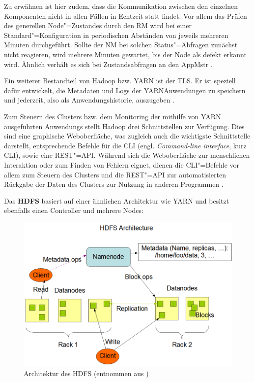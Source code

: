 Zu erwähnen ist hier zudem, dass die Kommunikation zwischen den einzelnen Komponenten nicht in allen Fällen in Echtzeit statt findet.
Vor allem das Prüfen des generellen Node"=Zustandes durch den \gls{RM} wird bei einer Standard"=Konfiguration in periodischen Abständen von jeweils mehreren Minuten durchgeführt.
Sollte der \gls{NM} bei solchen Status"=Abfragen zunächst nicht reagieren, wird mehrere Minuten gewartet, bis der Node als defekt erkannt wird.
Ähnlich verhält es sich bei Zustandsabfragen an den \gls{AppMstr} \cite{HadoopYarnConfig271}.

Ein weiterer Bestandteil von Hadoop bzw. \gls{YARN} ist der \gls{TLS}.
Er ist speziell dafür entwickelt, die Metadaten und Logs der \gls{YARN}\gls{Anwendung}en zu speichern und jederzeit, also als Anwendungshistorie, auszugeben \cite{HadoopYarnTlServer271}.

Zum Steuern des Clusters bzw. dem Monitoring der mithilfe von \gls{YARN} ausgeführten \glspl{Anwendung} stellt Hadoop drei Schnittstellen zur Verfügung.
Dies sind eine graphische Weboberfläche, was zugleich auch die wichtigste Schnittstelle darstellt, entsprechende Befehle für die \acrlong{CLI} (engl. \emph{Command-line interface}, kurz \acrshort{CLI}), sowie eine \gls{REST}"=API.
Während sich die Weboberfläche zur menschlichen Interaktion oder zum Finden von Fehlern eignet, dienen die \gls{CLI}"=Befehle vor allem zum Steuern des Clusters und die \gls{REST}"=API zur automatisierten Rückgabe der Daten des Clusters zur Nutzung in anderen Programmen \cite{HadoopClusterSetup271,HadoopYarnCmds271,HadoopRmApi271,HadoopNmApi271}.

Das \textbf{\gls{HDFS}} basiert auf einer ähnlichen Architektur wie \gls{YARN} und besitzt ebenfalls einen Controller und mehrere Nodes:

\begin{figure}[h]
    \includegraphics{./resources/hdfsarchitecture.png}
    \caption[Architektur des HDFS]
    {Architektur des \acrshort{HDFS} (entnommen aus \cite{HadoopHdfsDesc271})}
    \label{fig:hdfsarch}
\end{figure}

